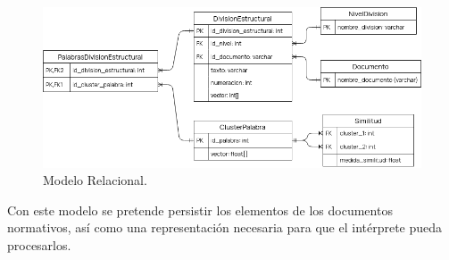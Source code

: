 \begin{figure}[ht]
    \centering
    \includegraphics[scale=0.55]{images/5/diagrama-relacional.png}
    \caption{Modelo Relacional.}
    \label{fig:diagrama-relacional}
\end{figure}

Con este modelo se pretende persistir los elementos de los documentos normativos, así como una representación necesaria para que el intérprete pueda procesarlos.

